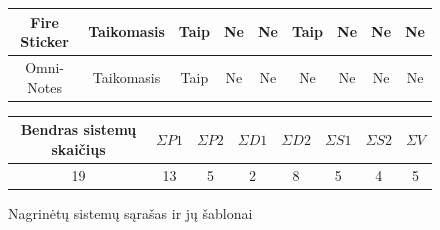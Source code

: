 \begin{figure}[H]
\begin{center}
\begin{tabular}{|c|c|c|c|c|c|c|c|c|}
        Fire Sticker                    & Taikomasis                & Taip                          & Ne                            & Ne                         & Taip                       & Ne                 & Ne                 & Ne                  \\ \hline
        Omni-Notes                      & Taikomasis                & Taip                          & Ne                            & Ne                         & Ne                         & Ne                 & Ne                 & Ne                  \\ \hline
    \end{tabular}

    \begin{tabular}{|c|c|c|c|c|c|c|c|}
        \hline
        Bendras sistemų skaičiųs & $\Sigma P1 $ & $\Sigma P2 $ & $\Sigma D1 $ & $\Sigma D2 $ & $\Sigma  S1 $ & $\Sigma  S2 $ & $\Sigma V $ \\ \hline\hline
        19 & 13 & 5 & 2 & 8 & 5 & 4 & 5 \\ \hline
    \end{tabular}
    \end{center}
    \caption{Nagrinėtų sistemų sąrašas ir jų šablonai}
    \label{table:analizedSystems}
\end{figure}
